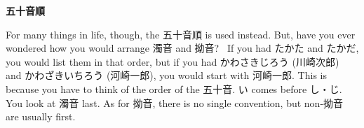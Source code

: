 \begin{center}
 \textbf{五十音順 }
\end{center}

\par{ For many things in life, though, the 五十音順 is used instead. But, have you ever wondered how you would arrange 濁音 and 拗音?  If you had たかた and たかだ, you would list them in that order, but if you had かわさきじろう (川崎次郎)　and かわざきいちろう (河崎一郎), you would start with 河崎一郎. This is because you have to think of the order of the 五十音. い comes before し・じ. You look at 濁音 last. As for 拗音, there is no single convention, but non-拗音 are usually first. }
    